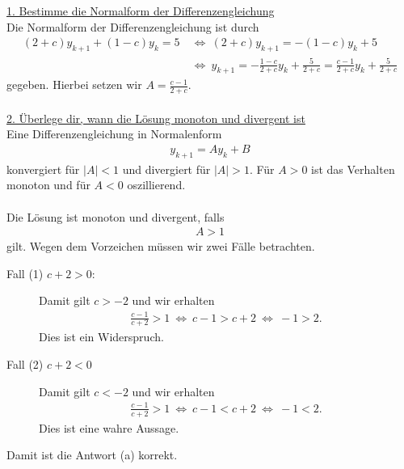 \underline{1. Bestimme die Normalform der Differenzengleichung}\\
Die Normalform der Differenzengleichung ist durch
\begin{align*}
(2 + c) y_{k+1} + (1-c) y_k = 5
\ &\Leftrightarrow \
(2+c)y_{k+1} = -(1-c) y_k +5\\
\ &\Leftrightarrow \
y_{k+1} = - \frac{1-c}{2+c} y_k + \frac{5}{2+c}
= \frac{c-1}{2+c} y_k + \frac{5}{2+c}
\end{align*}
gegeben. Hierbei setzen wir $ A = \frac{c-1}{2+c} $.\\
\\
\underline{2. Überlege dir, wann die Lösung monoton und divergent ist}\\
Eine Differenzengleichung in Normalenform
\begin{align*}
y_{k+1} = A y_{k} + B
\end{align*}
konvergiert für $ |A| < 1 $ und divergiert für $ |A| > 1 $.
Für $ A> 0 $ ist das Verhalten monoton und für $  A < 0 $ oszillierend.\\
\\ 
Die Lösung ist monoton und divergent, falls
\begin{align*}
A > 1
\end{align*}
gilt. Wegen dem Vorzeichen müssen wir zwei Fälle betrachten.
\begin{description}
	\item[Fall (1) $ c + 2 > 0 $:]
	Damit gilt $ c > -2 $ und wir erhalten 
	\begin{align*}
	\frac{c-1}{c+2} > 1
	\ \Leftrightarrow \
	c-1 > c+2
	\ \Leftrightarrow \ -1 > 2.
	\end{align*}
	Dies ist ein Widerspruch.
	
	\item[Fall (2) $ c +2 < 0 $] 
	Damit gilt $ c < -2 $ und wir erhalten
	\begin{align*}
	\frac{c-1}{c+2} > 1
	\ \Leftrightarrow \
	c-1 < c+2
	\ \Leftrightarrow \
	-1 < 2.
	\end{align*}
	Dies ist eine wahre Aussage.
\end{description}
Damit ist die Antwort (a) korrekt.